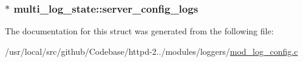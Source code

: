 \subsubsection[{\texorpdfstring{server\+\_\+config\+\_\+logs}{server_config_logs}}]{$\ast$ multi\+\_\+log\+\_\+state\+::server\+\_\+config\+\_\+logs}\hypertarget{structmulti__log__state_a2e7f7a723b5c1cea041979bd8e83a727}{}\label{structmulti__log__state_a2e7f7a723b5c1cea041979bd8e83a727}


The documentation for this struct was generated from the following file\+:\begin{DoxyCompactItemize}
\item 
/usr/local/src/github/\+Codebase/httpd-\/2../modules/loggers/\hyperlink{mod__log__config_8c}{mod\+\_\+log\+\_\+config.\+c}\end{DoxyCompactItemize}
